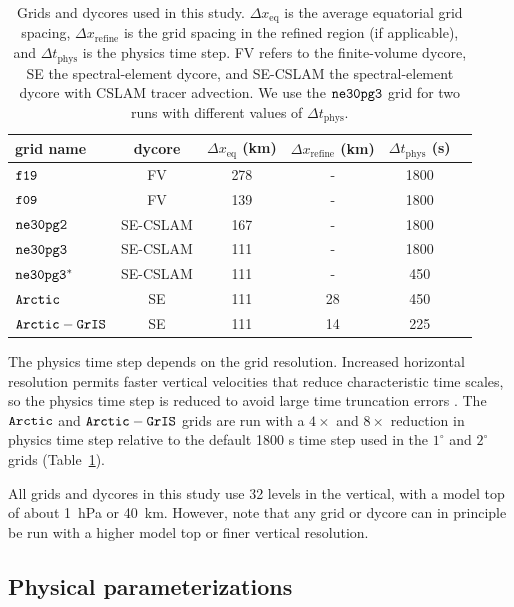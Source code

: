 \documentclass[draft]{agujournal2019}
\begin{document}
 \begin{table}
 \centering
 \scriptsize
 \begin{tabular}{lccccc}
   \hline
   grid name & dycore & $\Delta x_{\mathrm{eq}}$ (km) & $\Delta x_{\mathrm{refine}}$ (km) & $\Delta t_{\mathrm{phys}}$ (s) \\ 
   \hline
   $\tt f19$ & FV & 278 & - &1800 \\
   $\tt f09$ & FV & 139 & - &1800 \\
   $\tt ne30pg2$ & SE-CSLAM & 167 & - & 1800 \\
   $\tt ne30pg3$ & SE-CSLAM & 111 & - & 1800 \\
   $\tt ne30pg3^{*}$ & SE-CSLAM & 111 & - & 450 \\
   $\tt Arctic$ & SE & 111 & 28 & 450 \\
   $\tt Arctic-GrIS$ & SE & 111 & 14 & 225 \\
 \hline
 \end{tabular}
  \caption{Grids and dycores used in this study. $\Delta x_{\mathrm{eq}}$ is the average equatorial grid spacing, $\Delta x_{\mathrm{refine}}$ is the grid spacing in the refined region (if applicable), and $\Delta t_{\mathrm{phys}}$ is the physics time step. FV refers to the finite-volume dycore, SE the spectral-element dycore, and SE-CSLAM the spectral-element dycore with CSLAM tracer advection.  We use the $\tt ne30pg3$ grid for two runs with different values of $\Delta t_{\mathrm{phys}}$.{\color{purple}{Rene - maybe include model cost?}}}
 \label{tbl:table1}
 \end{table}

The physics time step depends on the grid resolution. Increased horizontal resolution permits faster vertical velocities that reduce characteristic time scales, so the physics time step is reduced to avoid large time truncation errors \cite{HR2018JAMES}. The $\tt Arctic$ and $\tt Arctic-GrIS$ grids are run with a $4\times$ and $8\times$ reduction in physics time step relative to the default 1800 s time step used in the $1^{\circ}$ and $2^{\circ}$ grids (Table~\ref{tbl:table1}).

All grids and dycores in this study use 32 levels in the vertical, with a model top of about 1~hPa or 40~km. However, note that any grid or dycore can in principle be run with a higher model top or finer vertical resolution.

\subsection{Physical parameterizations}
\end{document}
